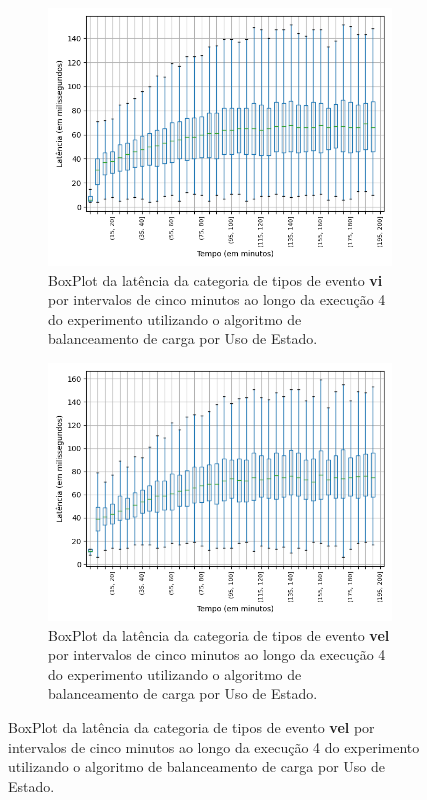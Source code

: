 \begin{figure}
\begin{subfigure}{.5\textwidth}
\centering
\includegraphics[width=\textwidth]{figuras/graphics/boxplot_9-dez-su_vi.png}
\caption{BoxPlot da latência da categoria de tipos de evento \textbf{vi} por intervalos de cinco minutos ao longo da execução 4 do experimento utilizando o algoritmo de balanceamento de carga por Uso de Estado.}
\label{fig:BoxPlot_vi_SU_9-dez-su}
\end{subfigure}%
\centering
\begin{subfigure}{.5\textwidth}
\centering
\includegraphics[width=\textwidth]{figuras/graphics/boxplot_9-dez-su_vel.png}
\caption{BoxPlot da latência da categoria de tipos de evento \textbf{vel} por intervalos de cinco minutos ao longo da execução 4 do experimento utilizando o algoritmo de balanceamento de carga por Uso de Estado.}
\label{fig:BoxPlot_vel_SU_9-dez-su}
\end{subfigure}%


\end{figure}
